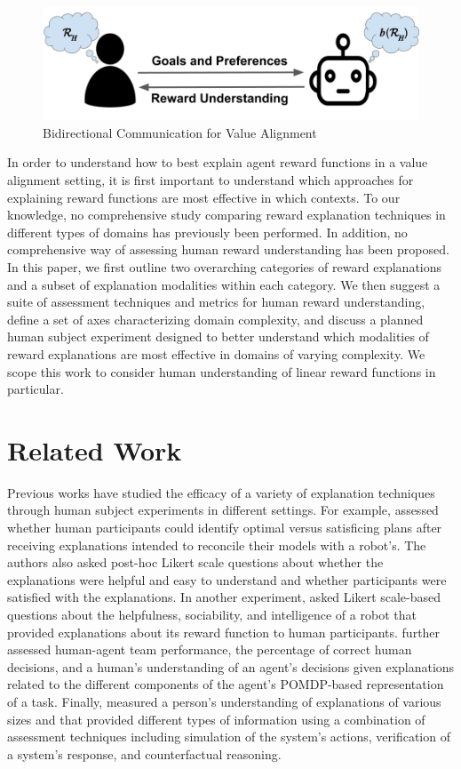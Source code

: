 \documentclass[letterpaper]{article} %
\begin{document}
\begin{figure}[t]
\centering
\includegraphics[width=0.8\columnwidth]{twowaycomm1.png}
\caption{Bidirectional Communication for Value Alignment}
\label{twoway}
\end{figure}


In order to understand how to best explain agent reward functions in a value alignment setting, it is first important to understand which approaches for explaining reward functions are most effective in which contexts. To our knowledge, no comprehensive study comparing reward explanation techniques in different types of domains has previously been performed. In addition, no comprehensive way of assessing human reward understanding has been proposed. In this paper, we first outline two overarching categories of reward explanations and a subset of explanation modalities within each category. We then suggest a suite of assessment techniques and metrics for human reward understanding, define a set of axes characterizing domain complexity, and discuss a planned human subject experiment designed to better understand which modalities of reward explanations are most effective in domains of varying complexity. We scope this work to consider human understanding of linear reward functions in particular.

\section{Related Work}
\label{related}
Previous works have studied the efficacy of a variety of explanation techniques through human subject experiments in different settings. For example, \citet{chakraborti2019plan} assessed whether human participants could identify optimal versus satisficing plans after receiving explanations intended to reconcile their models with a robot's. The authors also asked post-hoc Likert scale questions about whether the explanations were helpful and easy to understand and whether participants were satisfied with the explanations. In another experiment, \citet{tabrez2019explanation} asked Likert scale-based questions about the helpfulness, sociability, and intelligence of a robot that provided explanations about its reward function to human participants. \citet{wang2016impact} further assessed human-agent team performance, the percentage of correct human decisions, and a human's understanding of an agent's decisions given explanations related to the different components of the agent's POMDP-based representation of a task. Finally, \citet{lage2019evaluation} measured a person's understanding of explanations of various sizes and that provided different types of information using a combination of assessment techniques including simulation of the system's actions, verification of a system's response, and counterfactual reasoning.
\end{document}
